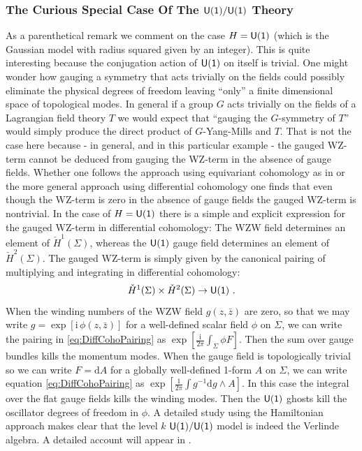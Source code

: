 \documentclass[a4paper,11pt]{article}
\newcommand{\rd}{\mathrm{d}}
\newcommand{\im}{\mathrm{i}}
\newcommand{\tsf}[1]{\textsf{#1}}
\def\be{ \begin{equation} }
\def\ee{ \end{equation}}
\begin{document}
\subsubsection{The Curious Special Case Of The $\mathsf{U(1)/U(1)}$ Theory }

As a parenthetical remark we comment on the  case $H=\mathsf{U(1)}$ (which is the Gaussian model with radius squared given by an integer). This is quite interesting because the conjugation action of $\mathsf{U(1)}$   on itself is trivial.  One might wonder how gauging a symmetry that acts trivially on the fields could possibly eliminate the physical degrees of freedom leaving ``only'' a finite dimensional space of topological modes. In general if a group $G$ acts trivially on the fields of a Lagrangian field theory $T$ we would expect that ``gauging the $G$-symmetry of $T$'' would simply produce the direct product of $G$-Yang-Mills and $T$. That is not the case here because - in general, and in this particular example - the gauged \tsf{WZ}-term cannot be deduced from gauging the \tsf{WZ}-term in the absence of gauge fields. Whether one follows the approach using equivariant cohomology as in \cite{Witten:1991mm,Figueroa-OFarrill:1994uwr,Figueroa-OFarrill:1994vwl}
  or the more general approach using differential cohomology one finds that even though the \tsf{WZ}-term is zero in the absence of gauge fields the gauged \tsf{WZ}-term is nontrivial. In the case of $H=\mathsf{U(1)}$ there is a simple and explicit expression for the gauged \tsf{WZ}-term in differential 
  cohomology:   The \tsf{WZW} field determines an element of $\check H^1(\Sigma)$, whereas 
the $\mathsf{U(1)}$ gauge field determines an element of $\check H^2(\Sigma)$. The gauged \tsf{WZ}-term is 
simply given by the canonical pairing of multiplying and integrating in differential cohomology: 
%
\be\label{eq:DiffCohoPairing}
\check H^1(\Sigma) \times \check H^2(\Sigma) \to \mr{U(1)}~. 
\ee
%
When the winding numbers of the \tsf{WZW} field $g(z,\bar z)$ are zero, so that we may write 
$g = \exp[ \im\, \phi(z,\bar z)]$ for a well-defined scalar field $\phi$ on $\Sigma$, we can write
the pairing in \eqref{eq:DiffCohoPairing}  as 
$\exp[ \frac{\im}{2\pi}  \int_{\Sigma}  \phi F ]$. Then   the sum over gauge bundles kills the momentum modes. When the 
gauge field is topologically trivial so we can write $F=\rd A$ for a globally well-defined 1-form $A$ on $\Sigma$, we can write
equation \eqref{eq:DiffCohoPairing}  as 
 $\exp[ \frac{1}{2\pi} \int g^{-1} \rd g \wedge A] $. In this case the integral over the flat gauge fields kills the winding modes. Then the $\mathsf{U(1)}$ ghosts kill the oscillator degrees of freedom in $\phi$.
 A detailed study using the Hamiltonian approach makes clear that the level $k$ $\mathsf{U(1)/U(1)}$ model is indeed the Verlinde algebra. A detailed account will appear in \cite{MRS}.  
\end{document}

